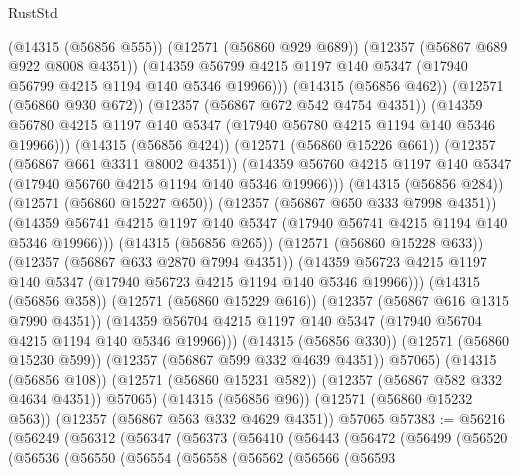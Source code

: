 \begin{lexlean}{RustStd}
\begin{coremodule}
                    (@14315 (@56856 @555))
                    (@12571 (@56860 @929 @689))
                    (@12357 (@56867 @689 @922 @8008 @4351))
                    (@14359
                      @56799
                      @4215
                      @1197
                      @140
                      @5347
                      (@17940 @56799 @4215 @1194 @140 @5346 @19966)))
                  (@14315 (@56856 @462))
                  (@12571 (@56860 @930 @672))
                  (@12357 (@56867 @672 @542 @4754 @4351))
                  (@14359
                    @56780
                    @4215
                    @1197
                    @140
                    @5347
                    (@17940 @56780 @4215 @1194 @140 @5346 @19966)))
                (@14315 (@56856 @424))
                (@12571 (@56860 @15226 @661))
                (@12357 (@56867 @661 @3311 @8002 @4351))
                (@14359
                  @56760
                  @4215
                  @1197
                  @140
                  @5347
                  (@17940 @56760 @4215 @1194 @140 @5346 @19966)))
              (@14315 (@56856 @284))
              (@12571 (@56860 @15227 @650))
              (@12357 (@56867 @650 @333 @7998 @4351))
              (@14359 @56741 @4215 @1197 @140 @5347 (@17940 @56741 @4215 @1194 @140 @5346 @19966)))
            (@14315 (@56856 @265))
            (@12571 (@56860 @15228 @633))
            (@12357 (@56867 @633 @2870 @7994 @4351))
            (@14359 @56723 @4215 @1197 @140 @5347 (@17940 @56723 @4215 @1194 @140 @5346 @19966)))
          (@14315 (@56856 @358))
          (@12571 (@56860 @15229 @616))
          (@12357 (@56867 @616 @1315 @7990 @4351))
          (@14359 @56704 @4215 @1197 @140 @5347 (@17940 @56704 @4215 @1194 @140 @5346 @19966)))
        (@14315 (@56856 @330))
        (@12571 (@56860 @15230 @599))
        (@12357 (@56867 @599 @332 @4639 @4351))
        @57065)
      (@14315 (@56856 @108))
      (@12571 (@56860 @15231 @582))
      (@12357 (@56867 @582 @332 @4634 @4351))
      @57065)
    (@14315 (@56856 @96))
    (@12571 (@56860 @15232 @563))
    (@12357 (@56867 @563 @332 @4629 @4351))
    @57065
@57383 := @56216
    (@56249
      (@56312
        (@56347
          (@56373
            (@56410
              (@56443
                (@56472
                  (@56499
                    (@56520
                      (@56536
                        (@56550
                          (@56554
                            (@56558
                              (@56562
                                (@56566
                                  (@56593

\end{coremodule}
\end{lexlean}
